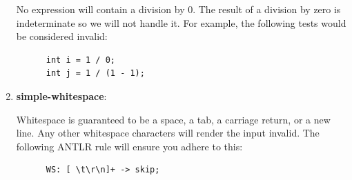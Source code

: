 \documentclass{article}
\newcommand{\assertiondest}[1]{\hypertarget{#1}{\textbf{#1}:}}
\begin{document}
\begin{enumerate}
    No expression will contain a division by 0. The result of a division by zero is indeterminate
    so we will not handle it. For example, the following tests would be considered invalid:
    \begin{lstlisting}
      int i = 1 / 0;
      int j = 1 / (1 - 1);
    \end{lstlisting}
  \item
    \assertiondest{simple-whitespace}
    Whitespace is guaranteed to be a space, a tab, a carriage return, or a new
    line. Any other whitespace characters will render the input invalid. The following ANTLR rule
    will ensure you adhere to this:
    \begin{lstlisting}
      WS: [ \t\r\n]+ -> skip;
    \end{lstlisting}
\end{enumerate}
\end{document}
